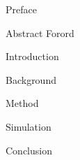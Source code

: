 \documentclass{article}
\begin{document}
\frontmatter
{Preface}

{Abstract}
{Forord}

\newpage

\singlespacing
\tableofcontents
\doublespacing


\newpage
\listoffigures
\newpage
\printnoidxglossaries

\mainmatter

{Introduction}

{Background}

{Method}

{Simulation}

{Conclusion}




\newpage
\printbibliography[heading = bibintoc, title = References]    %


\end{document}
